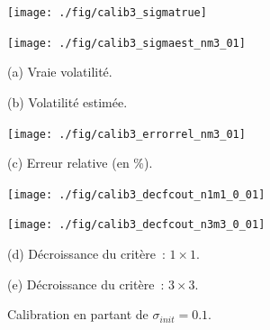 \begin{figure}[!htbp]

\begin{center}
\begin{minipage}{5.8cm}
\centerline{\texttt{[image: ./fig/calib3\_sigmatrue]}
} 
\end{minipage}
\hspace*{0.1cm}
\begin{minipage}{5.8cm}
\centerline{\texttt{[image: ./fig/calib3\_sigmaest\_nm3\_01]}
}
\end{minipage}
\end{center}

\begin{center}
\begin{minipage}{5.8cm}
(a) Vraie volatilit\'e.
\end{minipage}
\hspace*{0.1cm}
\begin{minipage}{5.8cm}
(b) Volatilit\'e estim\'ee.
\end{minipage}
\end{center}

\medskip

\begin{center}
\begin{minipage}{5.8cm}
\centerline{\texttt{[image: ./fig/calib3\_errorrel\_nm3\_01]}
}
\end{minipage}
\end{center}

\begin{center}
\begin{minipage}{5.8cm}
(c) Erreur relative (en \%).
\end{minipage}
\end{center}

\medskip

\begin{center}
\begin{minipage}{5.8cm}
\centerline{\texttt{[image: ./fig/calib3\_decfcout\_n1m1\_0\_01]}
}
\end{minipage}
\hspace*{0.1cm}
\begin{minipage}{5.8cm}
\centerline{\texttt{[image: ./fig/calib3\_decfcout\_n3m3\_0\_01]}
}
\end{minipage}
\end{center}

\begin{center}
\begin{minipage}{5.8cm}
(d) D\'ecroissance du crit\`ere~: $1 \times 1$.
\end{minipage}
\hspace*{0.1cm}
\begin{minipage}{5.8cm}
(e) D\'ecroissance du crit\`ere~: $3 \times 3$.
\end{minipage}
\end{center}

\caption{Calibration en partant de $\sigma_{init} = 0.1$.}
\label{FIG:CALIB3_NM3_01}
\end{figure}

